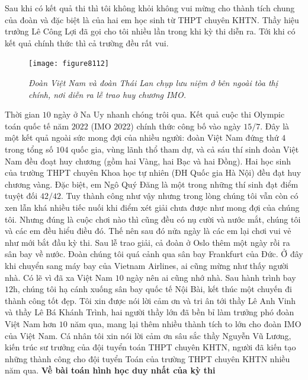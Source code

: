 \begin{multicols}{2}
	\vskip 0.05cm
	Sau khi có kết quả thi thì tôi không khỏi không vui mừng cho thành tích chung của đoàn và đặc biệt là của hai em học sinh từ THPT chuyên KHTN. Thầy hiệu trưởng Lê Công Lợi đã gọi cho tôi nhiều lần trong khi kỳ thi diễn ra. Tới khi có kết quả chính thức thì cả trường đều rất vui.
	\begin{figure}[H]
		\vspace*{-5pt}
		\centering
		\captionsetup{labelformat= empty, justification=centering}
		\texttt{[image: figure8112]}
		\caption{\small\textit{\color{cackithi}Đoàn Việt Nam và đoàn Thái Lan chụp lưu niệm ở bên ngoài tòa thị chính, nơi diễn ra lễ trao huy chương IMO.}}
		\vspace*{-10pt}
	\end{figure}
	Thời gian $10$ ngày ở Na Uy nhanh chóng trôi qua.  Kết quả cuộc thi Olympic toán quốc tế năm $2022$ (IMO $2022$) chính thức công bố vào ngày $15/7$. Đây là một kết quả ngoài sức mong đợi của nhiều người: đoàn Việt Nam đứng thứ $4$ trong tổng số $104$ quốc gia, vùng lãnh thổ tham dự, và cả sáu thí sinh đoàn Việt Nam đều đoạt huy chương (gồm hai Vàng, hai Bạc và hai Đồng). Hai học sinh của trường THPT chuyên Khoa học tự nhiên (ĐH Quốc gia Hà Nội) đều đạt huy chương vàng. Đặc biệt, em Ngô Quý Đăng là một trong những thí sinh đạt điểm tuyệt đối $42/42$. Tuy thành công như vậy nhưng trong lòng chúng tôi vẫn còn có xen lẫn khá nhiều tiếc nuối khi điểm xét giải  chưa được như mong đợi của chúng tôi. Nhưng đúng là cuộc chơi nào thì cũng đều có nụ cười và nước mắt, chúng tôi và các em đều hiểu điều đó. Thế nên sau đó nửa ngày là các em lại chơi vui vẻ như mới bắt đầu kỳ thi.
	\vskip 0.05cm
	Sau lễ trao giải, cả đoàn ở Oslo thêm một ngày rồi ra sân bay về nước. Đoàn chúng tôi quá cảnh qua sân bay Frankfurt của Đức. Ở đây khi chuyển sang máy bay của Vietnam Airlines, ai cũng mừng như thấy người nhà. Có lẽ vì đã xa Việt Nam $10$ ngày nên ai cũng nhớ nhà. Sau hành trình bay $12$h, chúng tôi hạ cánh xuống sân bay quốc tế Nội Bài, kết thúc một chuyến đi thành công tốt đẹp.
	\vskip 0.05cm
	Tôi xin được nói lời cảm ơn và tri ân tới thầy Lê Anh Vinh và thầy Lê Bá Khánh Trình, hai người thầy lớn đã bền bỉ làm trưởng phó đoàn Việt Nam hơn $10$ năm qua, mang lại thêm nhiều thành tích to lớn cho đoàn IMO của Việt Nam. Cá nhân tôi xin nói lời cảm ơn sâu sắc thầy Nguyễn Vũ Lương, kiến trúc sư trưởng của đội tuyển toán THPT chuyên KHTN, người đã kiến tạo những thành công cho đội tuyển Toán của trường THPT chuyên KHTN nhiều năm qua.
	\vskip 0.05cm
	{\bf\color{cackithi}Về bài toán hình học duy nhất của kỳ thi}
	\vskip 0.05cm 

\end{multicols}
